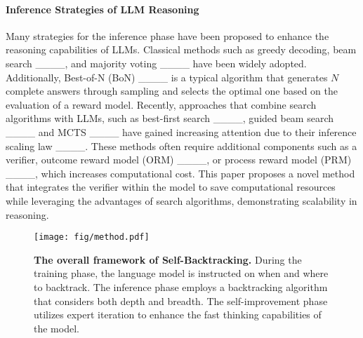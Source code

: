 \paragraph{Inference Strategies of LLM Reasoning}
Many strategies for the inference phase have been proposed to enhance the reasoning capabilities of LLMs. Classical methods such as greedy decoding, beam search ____, and majority voting ____ have been widely adopted. Additionally, Best-of-N (BoN) ____ is a typical algorithm that generates $N$ complete answers through sampling and selects the optimal one based on the evaluation of a reward model. Recently, approaches that combine search algorithms with LLMs, such as best-first search ____, guided beam search ____ and MCTS ____ have gained increasing attention due to their inference scaling law ____. These methods often require additional components such as a verifier, outcome reward model (ORM) ____, or process reward model (PRM) ____, which increases computational cost. This paper proposes a novel method that integrates the verifier within the model to save computational resources while leveraging the advantages of search algorithms, demonstrating scalability in reasoning.

\begin{figure*}[t]
    \centering
    \texttt{[image: fig/method.pdf]}
    \caption{
        \textbf{The overall framework of Self-Backtracking.} During the training phase, the language model is instructed on when and where to backtrack. The inference phase employs a backtracking algorithm that considers both depth and breadth. The self-improvement phase utilizes expert iteration to enhance the fast thinking capabilities of the model.
        }
    \label{method}
\end{figure*}